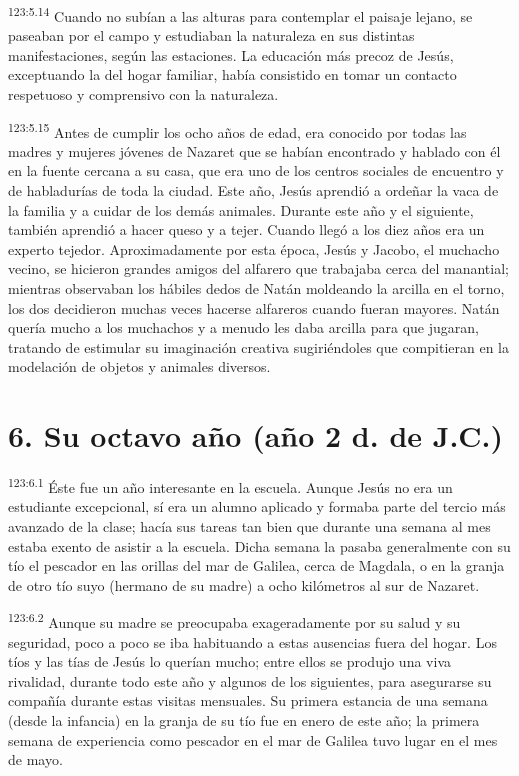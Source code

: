 \par
\textsuperscript{123:5.14} Cuando no subían a las alturas para contemplar el paisaje lejano, se paseaban por el campo y estudiaban la naturaleza en sus distintas manifestaciones, según las estaciones. La educación más precoz de Jesús, exceptuando la del hogar familiar, había consistido en tomar un contacto respetuoso y comprensivo con la naturaleza.

\par
\textsuperscript{123:5.15} Antes de cumplir los ocho años de edad, era conocido por todas las madres y mujeres jóvenes de Nazaret que se habían encontrado y hablado con él en la fuente cercana a su casa, que era uno de los centros sociales de encuentro y de habladurías de toda la ciudad. Este año, Jesús aprendió a ordeñar la vaca de la familia y a cuidar de los demás animales. Durante este año y el siguiente, también aprendió a hacer queso y a tejer. Cuando llegó a los diez años era un experto tejedor. Aproximadamente por esta época, Jesús y Jacobo, el muchacho vecino, se hicieron grandes amigos del alfarero que trabajaba cerca del manantial; mientras observaban los hábiles dedos de Natán moldeando la arcilla en el torno, los dos decidieron muchas veces hacerse alfareros cuando fueran mayores. Natán quería mucho a los muchachos y a menudo les daba arcilla para que jugaran, tratando de estimular su imaginación creativa sugiriéndoles que compitieran en la modelación de objetos y animales diversos.

\section*{6. Su octavo año (año 2 d. de J.C.)}
\par
\textsuperscript{123:6.1} Éste fue un año interesante en la escuela. Aunque Jesús no era un estudiante excepcional, sí era un alumno aplicado y formaba parte del tercio más avanzado de la clase; hacía sus tareas tan bien que durante una semana al mes estaba exento de asistir a la escuela. Dicha semana la pasaba generalmente con su tío el pescador en las orillas del mar de Galilea, cerca de Magdala, o en la granja de otro tío suyo (hermano de su madre) a ocho kilómetros al sur de Nazaret.

\par
\textsuperscript{123:6.2} Aunque su madre se preocupaba exageradamente por su salud y su seguridad, poco a poco se iba habituando a estas ausencias fuera del hogar. Los tíos y las tías de Jesús lo querían mucho; entre ellos se produjo una viva rivalidad, durante todo este año y algunos de los siguientes, para asegurarse su compañía durante estas visitas mensuales. Su primera estancia de una semana (desde la infancia) en la granja de su tío fue en enero de este año; la primera semana de experiencia como pescador en el mar de Galilea tuvo lugar en el mes de mayo.

